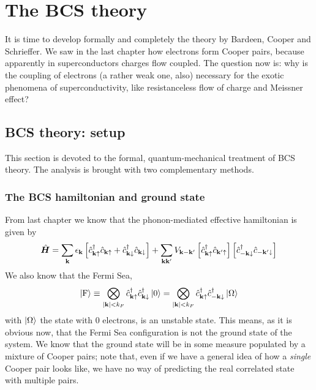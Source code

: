 \chapter{The BCS theory}\chaptertoc{}\label{chap:the bcs theory}

It is time to develop formally and completely the theory by Bardeen, Cooper and Schrieffer. We saw in the last chapter how electrons form Cooper pairs, because apparently in superconductors charges flow coupled. The question now is: why is the coupling of electrons (a rather weak one, also) necessary for the exotic phenomena of superconductivity, like resistanceless flow of charge and Meissner effect?

\section{BCS theory: setup}

This section is devoted to the formal, quantum-mechanical treatment of BCS theory. The analysis is brought with two complementary methods.

\subsection{The BCS hamiltonian and ground state}

From last chapter we know that the phonon-mediated effective hamiltonian is given by
\[
	\hat{\bm H} = \sum_{\mathbf{k}} \epsilon_{\mathbf{k}} \left[{\hat{c}_{\mathbf{k}\uparrow}^\dagger \hat{c}_{\mathbf{k}\uparrow} + \hat{c}_{\mathbf{k}\downarrow}^\dagger \hat{c}_{\mathbf{k}\downarrow}}\right] + \sum_{\mathbf{k}\mathbf{k}'} V_{\mathbf{k}-\mathbf{k}'} \left[{\hat{c}_{\mathbf{k}\uparrow}^\dagger \hat{c}_{\mathbf{k}'\uparrow}}\right] \left[{\hat{c}_{-\mathbf{k}\downarrow}^\dagger \hat{c}_{-\mathbf{k}'\downarrow}}\right]
\]
We also know that the Fermi Sea,
\[
	\ket{\mathrm{F}} \equiv \bigotimes_{\abs{\mathbf{k}} < k_F} \hat{c}_{\mathbf{k}\uparrow}^\dagger \hat{c}_{\mathbf{k}\downarrow}^\dagger \ket{0} = \bigotimes_{\abs{\mathbf{k}} < k_F} \hat{c}_{\mathbf{k}\uparrow}^\dagger \hat{c}_{-\mathbf{k}\downarrow}^\dagger \ket{\Omega}
\]
with $\ket{\Omega}$ the state with $0$ electrons, is an unstable state. This means, as it is obvious now, that the Fermi Sea configuration is not the ground state of the system. We know that the ground state will be in some measure populated by a mixture of Cooper pairs; note that, even if we have a general idea of how a \textit{single} Cooper pair looks like, we have no way of predicting the real correlated state with multiple pairs. 

